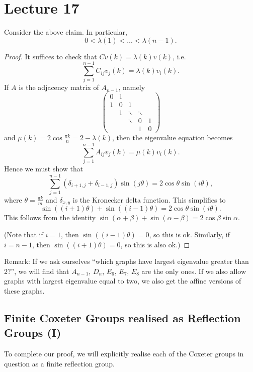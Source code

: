 \section{Lecture 17}

Consider the above claim. In particular,
\[
    0 < \lambda(1) < \dots < \lambda(n-1).
\]
\begin{proof}
It suffices to check that $C v(k) = \lambda(k) v(k)$, i.e.
\[
    \sum_{j=1}^{n-1} C_{ij} v_j(k) = \lambda(k) v_i(k).
\]
If $A$ is the adjacency matrix of $A_{n-1}$, namely
\[
    \begin{pmatrix}
        0 & 1 \\
        1 & 0 & 1 \\
          & 1 & \ddots & \ddots \\
          &   & \ddots & 0 & 1 \\
          &   &        & 1 & 0
    \end{pmatrix}
\]
and $\mu(k) = 2 \cos \frac{\pi k}{n} = 2 - \lambda(k)$, then the eigenvalue
equation becomes
\[
    \sum_{j=1}^{n-1} A_{ij} v_j(k) = \mu(k) v_i(k).
\]
Hence we must show that
\[
    \sum_{j=1}^{n-1} (\delta_{i+1,j} + \delta_{i-1,j}) \sin (j \theta)
    = 2 \cos \theta \sin (i \theta),
\]
where $\theta = \frac{\pi k}{m}$ and $\delta_{x,y}$ is the Kronecker delta function.
This simplifies to
\[
    \sin((i+1) \theta) + \sin ((i-1)\theta) = 2 \cos \theta \sin (i \theta).
\]
This follows from the identity $\sin (\alpha + \beta) + \sin (\alpha - \beta)
= 2 \cos \beta \sin \alpha$.

(Note that if $i=1$, then $\sin ((i-1) \theta) = 0$, so this is ok. Similarly,
if $i=n-1$, then $\sin((i+1) \theta) = 0$, so this is also ok.)
\end{proof}

Remark: If we ask ourselves ``which graphs have largest eigenvalue greater than
2?'', we will find that $A_{n-1}$, $D_n$, $E_6$, $E_7$, $E_8$ are the only ones.
If we also allow graphs with largest eigenvalue equal to two, we also get the
affine versions of these graphs.
\\

\subsection{Finite Coxeter Groups realised as Reflection Groups (I)}

To complete our proof, we will explicitly realise each of the Coxeter groups in
question as a finite reflection group.

